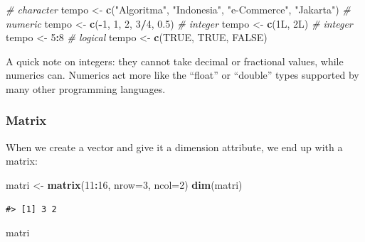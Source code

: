 \documentclass[]{article}
\newenvironment{Shaded}{\begin{snugshade}}{\end{snugshade}}
\newcommand{\CommentTok}[1]{\textcolor[rgb]{0.56,0.35,0.01}{\textit{#1}}}
\newcommand{\DataTypeTok}[1]{\textcolor[rgb]{0.13,0.29,0.53}{#1}}
\newcommand{\DecValTok}[1]{\textcolor[rgb]{0.00,0.00,0.81}{#1}}
\newcommand{\FloatTok}[1]{\textcolor[rgb]{0.00,0.00,0.81}{#1}}
\newcommand{\KeywordTok}[1]{\textcolor[rgb]{0.13,0.29,0.53}{\textbf{#1}}}
\newcommand{\NormalTok}[1]{#1}
\newcommand{\OperatorTok}[1]{\textcolor[rgb]{0.81,0.36,0.00}{\textbf{#1}}}
\newcommand{\OtherTok}[1]{\textcolor[rgb]{0.56,0.35,0.01}{#1}}
\newcommand{\StringTok}[1]{\textcolor[rgb]{0.31,0.60,0.02}{#1}}
\begin{document}
\begin{Shaded}
\begin{Highlighting}[]
\CommentTok{# character}
\NormalTok{tempo <-}\StringTok{ }\KeywordTok{c}\NormalTok{(}\StringTok{"Algoritma"}\NormalTok{, }\StringTok{"Indonesia"}\NormalTok{, }\StringTok{"e-Commerce"}\NormalTok{, }\StringTok{"Jakarta"}\NormalTok{)}
\CommentTok{# numeric}
\NormalTok{tempo <-}\StringTok{ }\KeywordTok{c}\NormalTok{(}\OperatorTok{-}\DecValTok{1}\NormalTok{, }\DecValTok{1}\NormalTok{, }\DecValTok{2}\NormalTok{, }\DecValTok{3}\OperatorTok{/}\DecValTok{4}\NormalTok{, }\FloatTok{0.5}\NormalTok{)}
\CommentTok{# integer}
\NormalTok{tempo <-}\StringTok{ }\KeywordTok{c}\NormalTok{(1L, 2L)}
\CommentTok{# integer}
\NormalTok{tempo <-}\StringTok{ }\DecValTok{5}\OperatorTok{:}\DecValTok{8}
\CommentTok{# logical}
\NormalTok{tempo <-}\StringTok{ }\KeywordTok{c}\NormalTok{(}\OtherTok{TRUE}\NormalTok{, }\OtherTok{TRUE}\NormalTok{, }\OtherTok{FALSE}\NormalTok{)}
\end{Highlighting}
\end{Shaded}

A quick note on integers: they cannot take decimal or fractional values,
while numerics can. Numerics act more like the ``float'' or ``double''
types supported by many other programming languages.

\hypertarget{matrix}{%
\subsubsection{Matrix}\label{matrix}}

When we create a vector and give it a dimension attribute, we end up
with a matrix:

\begin{Shaded}
\begin{Highlighting}[]
\NormalTok{matri <-}\StringTok{ }\KeywordTok{matrix}\NormalTok{(}\DecValTok{11}\OperatorTok{:}\DecValTok{16}\NormalTok{, }\DataTypeTok{nrow=}\DecValTok{3}\NormalTok{, }\DataTypeTok{ncol=}\DecValTok{2}\NormalTok{)}
\KeywordTok{dim}\NormalTok{(matri)}
\end{Highlighting}
\end{Shaded}

\begin{verbatim}
#> [1] 3 2
\end{verbatim}

\begin{Shaded}
\begin{Highlighting}[]
\NormalTok{matri}
\end{Highlighting}
\end{Shaded}
\end{document}
